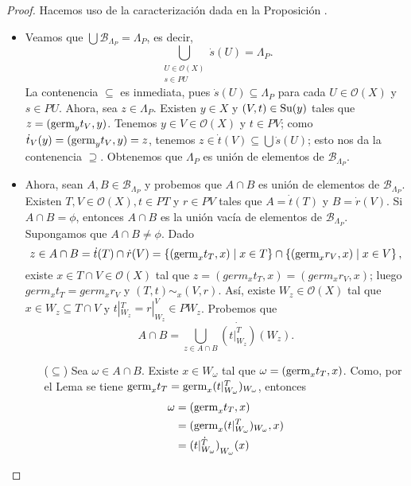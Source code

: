 \begin{proof}
   Hacemos uso de la caracterización dada en la Proposición .
   \begin{itemize}
      \item Veamos que $\bigcup \mathcal{B}_{\Lambda_P}=\Lambda_P$, es decir,
      $$
         \bigcup_{\substack{U\in\mathcal{O}(X) \\ s\in PU}}\dot{s}(U)=\Lambda_P.
      $$
      La contenencia $\subseteq$ es inmediata, pues $\dot{s}(U)\subseteq\Lambda_P$ para cada $U\in\mathcal{O}(X)$ y $s\in PU$. Ahora, sea $z\in\Lambda_{P}$. Existen $y\in X$ y $(V,t)\in\normalfont{\text{Su}}(y)$ tales que $z=(\normalfont{\text{germ}}_{y}t_{V},y)$. Tenemos $y\in V\in\mathcal{O}(X)$ y $t\in PV$; como $\dot{t}_{V}(y)=(\normalfont{\text{germ}}_{y}t_{V},y)=z$, tenemos $z\in\dot{t}(V)\subseteq\bigcup{\dot{s}(U)}$; esto nos da la contenencia $\supseteq$. Obtenemos que $\Lambda_P$ es unión de elementos de $\mathcal{B}_{\Lambda_P}$.
   \item Ahora, sean $A,B\in\mathcal{B}_{\Lambda_P}$ y probemos que $A\cap B$ es unión de elementos de $\mathcal{B}_{\Lambda_P}$. Existen $T,V\in\mathcal{O}(X), t\in PT$ y $r\in PV$ tales que $A=\dot{t}(T)$ y $B=\dot{r}(V)$. Si $A\cap B=\phi$, entonces $A\cap B$ es la unión vacía de elementos de $\mathcal{B}_{\Lambda_P}$. Supongamos que $A\cap B\neq\phi$. Dado
      $$ 
         z\in A\cap B =\dot{t}(T)\cap\dot{r}(V)=\left\lbrace (\normalfont{\text{germ}}_{x}t_{T},x)\mid x\in T\right\rbrace\cap\left\lbrace (\normalfont{\text{germ}}_{x}r_{V},x)\mid x\in V\right\rbrace,
      $$
      existe $x\in T\cap V\in \mathcal{O}(X)$ tal que $z=(germ_{x}t_{T},x)=(germ_{x}r_{V},x)$; luego $germ_{x}t_{T}=germ_{x}r_{V}$ y $(T,t)\sim_{x}(V,r)$. Así, existe $W_{z}\in\mathcal{O}(X)$ tal que $x\in W_z\subseteq T\cap V$ y $t|^{T}_{W_z}=r|^{V}_{W_z}\in PW_{z}$. Probemos que
      $$
         A\cap B=\bigcup_{z\in A\cap B}\dot{(t|^{T}_{W_z})}(W_z).
      $$
      \begin{itemize}
         \item[($\subseteq$)] Sea $\omega\in A\cap B$. Existe $x\in W_{\omega}$ tal que $\omega=(\normalfont{\text{germ}}_{x}t_{T},x)$. Como, por el Lema  se tiene $\normalfont{\text{germ}}_{x}t_{T}=\normalfont{\text{germ}}_{x}(t|^{T}_{W_{\omega}})_{W_{\omega}}$, entonces
            $$
            \begin{aligned}
               \omega&=(\normalfont{\text{germ}}_{x}t_{T},x)\\
                     &=(\normalfont{\text{germ}}_{x}(t|^{T}_{W_{\omega}})_{W_{\omega}},x)\\
                     &=\dot{(t|^{T}_{W_{\omega}})}_{W_{\omega}}(x)
            \end{aligned}
$$
\end{itemize}
\end{itemize}
\end{proof}
